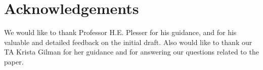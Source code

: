 \documentclass[sigconf, nonacm, natbib, screen, balance=False]{acmart}
\begin{document}
\section{Acknowledgements}\label{sec:acknowledgements}
We would like to thank Professor H.E. Plesser for his guidance, and for his valuable and detailed feedback on the initial draft. Also would like to thank our TA Krista Gilman for her guidance and for answering our questions related to the paper. 



\end{document}
